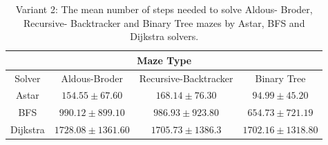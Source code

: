     \begin{table}[!h]
        \begin{center} 
            \caption{Variant 2: The mean number of steps needed to solve Aldous- Broder, Recursive- Backtracker and Binary Tree mazes by Astar,
             BFS and Dijkstra solvers.} 
        \begin{tabular}{ c c c c} 
        \multicolumn{5}{c}{Maze Type} \\
        \hline
        Solver&Aldous-Broder&Recursive-Backtracker&Binary Tree\\
        \hline
        Astar&$154.55\pm 67.60$&$168.14\pm 76.30$&$94.99\pm 45.20$\\
        \hline
        BFS&$990.12\pm 899.10$&$986.93\pm 923.80$&$654.73\pm 721.19$\\
        \hline
        Dijkstra&$1728.08\pm 1361.60$&$1705.73\pm 1386.3$&$1702.16\pm 1318.80$\\
        \hline
         \end{tabular} 
        \end{center}
         \end{table}
